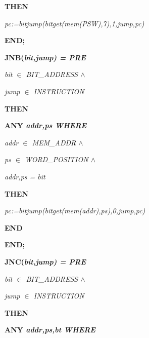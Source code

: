 \begin{sloppypar}
\hspace*{0.10in}\bf THEN

\hspace*{0.20in}\it pc\rm :=\it bitjump\rm (\it bitget\rm (\it mem\rm (\it PSW\rm )\rm ,\rm 7\rm )\rm ,\rm 1\rm ,\it jump\rm ,\it pc\rm )

\hspace*{0.10in}\bf END\rm ;

\hspace*{0.10in}\bf JNB\rm (\it bit\rm ,\it jump\rm ) \rm = \bf PRE

\hspace*{0.20in}\it bit $\in$  \it BIT\_ADDRESS  $\land$ 

\hspace*{0.20in}\it jump $\in$  \it INSTRUCTION

\hspace*{0.10in}\bf THEN

\hspace*{0.20in}\bf ANY \it addr\rm ,\it ps \bf WHERE

\hspace*{0.30in}\it addr $\in$  \it MEM\_ADDR  $\land$ 

\hspace*{0.30in}\it ps $\in$  \it WORD\_POSITION  $\land$ 

\hspace*{0.30in}\it addr\rm ,\it ps \rm = \it bit

\hspace*{0.20in}\bf THEN

\hspace*{0.30in}\it pc\rm :=\it bitjump\rm (\it bitget\rm (\it mem\rm (\it addr\rm )\rm ,\it ps\rm )\rm ,\rm 0\rm ,\it jump\rm ,\it pc\rm )

\hspace*{0.20in}\bf END

\hspace*{0.10in}\bf END\rm ;

\hspace*{0.10in}\bf JNC\rm (\it bit\rm ,\it jump\rm ) \rm = \bf PRE

\hspace*{0.20in}\it bit $\in$  \it BIT\_ADDRESS  $\land$ 

\hspace*{0.20in}\it jump $\in$  \it INSTRUCTION

\hspace*{0.10in}\bf THEN

\hspace*{0.20in}\bf ANY \it addr\rm ,\it ps\rm ,\it bt \bf WHERE


\end{sloppypar}
